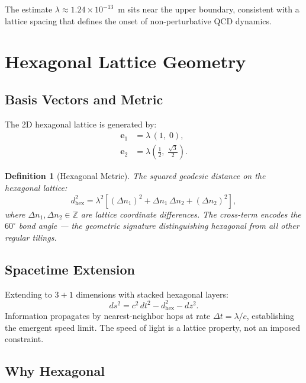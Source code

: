 \documentclass[11pt,letterpaper]{article}
\newtheorem{definition}[theorem]{Definition}
\begin{document}
The estimate $\lambda \approx 1.24\times10^{-13}$~m sits near the upper
boundary, consistent with a lattice spacing that defines the onset of
non-perturbative QCD dynamics.

\section{Hexagonal Lattice Geometry}

\subsection{Basis Vectors and Metric}

The 2D hexagonal lattice is generated by:
\begin{align}
  \mathbf{e}_1 &= \lambda\,(1,\;0), \\
  \mathbf{e}_2 &= \lambda\!\left(\tfrac{1}{2},\;\tfrac{\sqrt{3}}{2}\right).
\end{align}

\begin{definition}[Hexagonal Metric]
The squared geodesic distance on the hexagonal lattice:
\begin{equation}
  d^2_\mathrm{hex}
  = \lambda^2\!\left[(\Delta n_1)^2 + \Delta n_1\,\Delta n_2 + (\Delta n_2)^2\right],
\end{equation}
where $\Delta n_1,\Delta n_2\in\mathbb{Z}$ are lattice coordinate differences.
The cross-term encodes the $60^\circ$ bond angle --- the geometric signature
distinguishing hexagonal from all other regular tilings.
\end{definition}

\subsection{Spacetime Extension}

Extending to $3+1$ dimensions with stacked hexagonal layers:
\begin{equation}
  ds^2 = c^2\,dt^2 - d^2_\mathrm{hex} - dz^2.
\end{equation}
Information propagates by nearest-neighbor hops at rate $\Delta t = \lambda/c$,
establishing the emergent speed limit.  The speed of light is a lattice
property, not an imposed constraint.

\subsection{Why Hexagonal}
\end{document}
